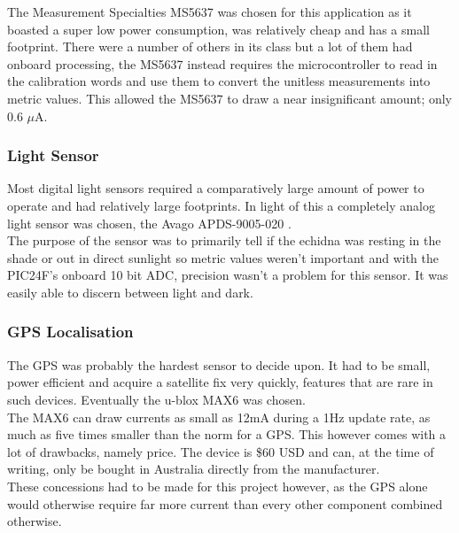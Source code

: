\documentclass[12pt,openany,a4paper]{book}
\begin{document}
			The Measurement Specialties MS5637 \cite{MEASPRESSURE} was chosen for this application as it boasted a super low power consumption, was relatively cheap and has a small footprint. There were a number of others in its class but a lot of them had onboard processing, the MS5637 instead requires the microcontroller to read in the calibration words and use them to convert the unitless measurements into metric values. This allowed the MS5637 to draw a near insignificant amount; only 0.6 $\mu$A.
			
			\subsubsection{Light Sensor}
			Most digital light sensors required a comparatively large amount of power to operate and had relatively large footprints. In light of this a completely analog light sensor was chosen, the Avago APDS-9005-020 \cite{AVAGOLIGHT}. \\
			
			The purpose of the sensor was to primarily tell if the echidna was resting in the shade or out in direct sunlight so metric values weren't important and with the PIC24F's onboard 10 bit ADC, precision wasn't a problem for this sensor. It was easily able to discern between light and dark. 
			
			
			\subsubsection{GPS Localisation}
			The GPS was probably the hardest sensor to decide upon. It had to be small, power efficient and acquire a satellite fix very quickly, features that are rare in such devices. Eventually the u-blox MAX6 \cite{ubloxGPS} was chosen. \\
			
			The MAX6 can draw currents as small as 12mA during a 1Hz update rate, as much as five times smaller than the norm for a GPS. This however comes with a lot of drawbacks, namely price. The device is \$60 USD and can, at the time of writing, only be bought in Australia directly from the manufacturer. \\
			
			These concessions had to be made for this project however, as the GPS alone would otherwise require far more current than every other component combined otherwise.
			
\end{document}
